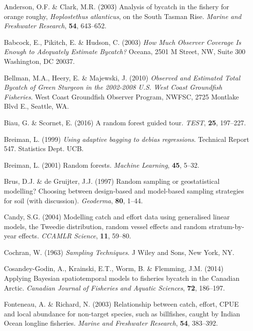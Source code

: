 \documentclass[]{article}
\begin{document}
\leavevmode\hypertarget{ref-anderson2003}{}%
Anderson, O.F. \& Clark, M.R. (2003) Analysis of bycatch in the fishery
for orange roughy, \emph{Hoplostethus atlanticus}, on the South Tasman
Rise. \emph{Marine and Freshwater Research}, \textbf{54}, 643--652.

\leavevmode\hypertarget{ref-babcock2003}{}%
Babcock, E., Pikitch, E. \& Hudson, C. (2003) \emph{How Much Observer
Coverage Is Enough to Adequately Estimate Bycatch?} Oceana, 2501 M
Street, NW, Suite 300 Washington, DC 20037.

\leavevmode\hypertarget{ref-bellman2010}{}%
Bellman, M.A., Heery, E. \& Majewski, J. (2010) \emph{Observed and
Estimated Total Bycatch of Green Sturgeon in the 2002-2008 U.S. West
Coast Groundfish Fisheries}. West Coast Groundfish Observer Program,
NWFSC, 2725 Montlake Blvd E., Seattle, WA.

\leavevmode\hypertarget{ref-biau2016}{}%
Biau, G. \& Scornet, E. (2016) A random forest guided tour. \emph{TEST},
\textbf{25}, 197--227.

\leavevmode\hypertarget{ref-breiman1999}{}%
Breiman, L. (1999) \emph{Using adaptive bagging to debias regressions}.
Technical Report 547. Statistics Dept. UCB.

\leavevmode\hypertarget{ref-breiman2001}{}%
Breiman, L. (2001) Random forests. \emph{Machine Learning}, \textbf{45},
5--32.

\leavevmode\hypertarget{ref-brus1997}{}%
Brus, D.J. \& de Gruijter, J.J. (1997) Random sampling or geostatistical
modelling? Choosing between design-based and model-based sampling
strategies for soil (with discussion). \emph{Geoderma}, \textbf{80},
1--44.

\leavevmode\hypertarget{ref-candy2004}{}%
Candy, S.G. (2004) Modelling catch and effort data using generalised
linear models, the Tweedie distribution, random vessel effects and
random stratum-by-year effects. \emph{CCAMLR Science}, \textbf{11},
59--80.

\leavevmode\hypertarget{ref-cochran1963}{}%
Cochran, W. (1963) \emph{Sampling Techniques}. J Wiley and Sons, New
York, NY.

\leavevmode\hypertarget{ref-cosandey-godin2014}{}%
Cosandey-Godin, A., Krainski, E.T., Worm, B. \& Flemming, J.M. (2014)
Applying Bayesian spatiotemporal models to fisheries bycatch in the
Canadian Arctic. \emph{Canadian Journal of Fisheries and Aquatic
Sciences}, \textbf{72}, 186--197.

\leavevmode\hypertarget{ref-fonteneau2003}{}%
Fonteneau, A. \& Richard, N. (2003) Relationship between catch, effort,
CPUE and local abundance for non-target species, such as billfishes,
caught by Indian Ocean longline fisheries. \emph{Marine and Freshwater
Research}, \textbf{54}, 383--392.
\end{document}
